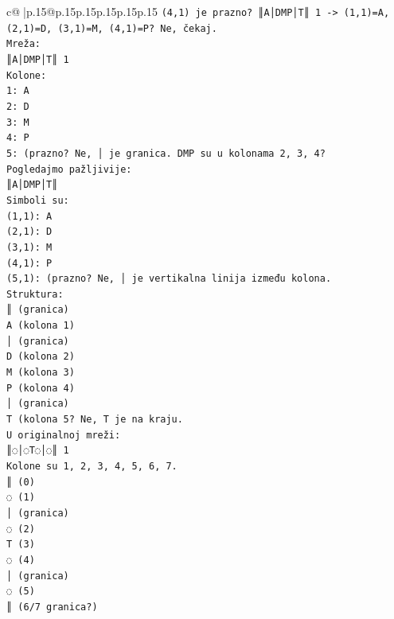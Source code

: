 \documentclass{article}
\begin{document}
{\begin{supertabular}{c@{$\;$}|p{.15\linewidth}@{}p{.15\linewidth}p{.15\linewidth}p{.15\linewidth}p{.15\linewidth}p{.15\linewidth}}
{{{\texttt{(4,1) je prazno? ║A│DMP│T║ 1 {-}> (1,1)=A, (2,1)=D, (3,1)=M, (4,1)=P? Ne, čekaj.} \\
\texttt{Mreža:} \\
\texttt{║A│DMP│T║ 1} \\
\texttt{Kolonе:} \\
\texttt{1: A} \\
\texttt{2: D} \\
\texttt{3: M} \\
\texttt{4: P} \\
\texttt{5: (prazno? Ne, │ je granica. DMP su u kolonama 2, 3, 4?} \\
\texttt{Pogledajmo pažljivije:} \\
\texttt{║A│DMP│T║} \\
\texttt{Simboli su:} \\
\texttt{(1,1): A} \\
\texttt{(2,1): D} \\
\texttt{(3,1): M} \\
\texttt{(4,1): P} \\
\texttt{(5,1): (prazno? Ne, │ je vertikalna linija između kolona.} \\
\texttt{Struktura:} \\
\texttt{║ (granica)} \\
\texttt{A (kolona 1)} \\
\texttt{│ (granica)} \\
\texttt{D (kolona 2)} \\
\texttt{M (kolona 3)} \\
\texttt{P (kolona 4)} \\
\texttt{│ (granica)} \\
\texttt{T (kolona 5? Ne, T je na kraju.} \\
\texttt{U originalnoj mreži:} \\
\texttt{║◌│◌T◌│◌║ 1} \\
\texttt{Kolonе su 1, 2, 3, 4, 5, 6, 7.} \\
\texttt{║ (0)} \\
\texttt{◌ (1)} \\
\texttt{│ (granica)} \\
\texttt{◌ (2)} \\
\texttt{T (3)} \\
\texttt{◌ (4)} \\
\texttt{│ (granica)} \\
\texttt{◌ (5)} \\
\texttt{║ (6/7 granica?)} \\
\\ 
}}}
\end{supertabular}}
\end{document}
